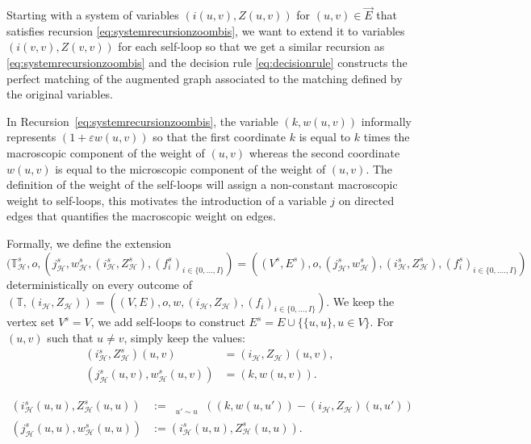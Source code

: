 \documentclass[11pt]{article}
\DeclareMathOperator{\lex}{lex}
\DeclareMathOperator*{\maxlex}{\overset{\lex}{\max}}
\newcommand{\eps}{\varepsilon}
\begin{document}
Starting with a system of variables $(i(u,v),Z(u,v))$ for $(u,v) \in \overset{\rightarrow}{E}$ that satisfies recursion \eqref{eq:systemrecursionzoombis}, we want to extend it to variables $(i(v,v),Z(v,v))$ for each self-loop so that we get a similar recursion as \eqref{eq:systemrecursionzoombis} and the decision rule \eqref{eq:decisionrule} constructs the perfect matching of the augmented graph associated to the matching defined by the original variables.

In Recursion~\eqref{eq:systemrecursionzoombis}, the variable $(k,w(u,v))$ informally represents $(1+\eps w(u,v))$ so that the first coordinate $k$ is equal to $k$ times the macroscopic component of the weight of $(u,v)$ whereas the second coordinate $w(u,v)$ is equal to the microscopic component of the weight of $(u,v)$. The definition of the weight of the self-loops will assign a non-constant macroscopic weight to self-loops, this motivates the introduction of a variable $j$ on directed edges that quantifies the macroscopic weight on edges.

Formally, we define the extension
\begin{equation} \label{eq:Tsh}
(\mathbb{T}^{s}_\mathcal{H},o,(j_{\mathcal{H}}^s,w_{\mathcal{H}}^s,(i_\mathcal{H}^s,Z_\mathcal{H}^{s}),(f_i^s)_{i \in \{0,...,I\}})=((V^{s},E^{s}),o,(j_{\mathcal{H}}^s,w^{s}_\mathcal{H}),(i_\mathcal{H}^s,Z_\mathcal{H}^{s}),(f_i^s)_{i \in \{0,....,I\}})
\end{equation}
deterministically on every outcome of $(\mathbb{T},(i_\mathcal{H},Z_\mathcal{H}))=((V,E),o,w,(i_\mathcal{H},Z_\mathcal{H}), (f_i)_{i \in \{0,...,I\}})$. 
We keep the vertex set $V^s=V$, we add self-loops to construct $E^s=E \cup \{ \{u,u\} , u \in V\}$. For $(u,v)$ such that $u \neq v$, simply keep the values:
\begin{equation}
    \begin{aligned}
        (i_\mathcal{H}^s,Z_\mathcal{H}^s)(u,v)&=(i_\mathcal{H},Z_\mathcal{H})(u,v) ,\\
        (j_{\mathcal{H}}^s(u,v),w_{\mathcal{H}}^s(u,v))&=(k,w(u,v)).
    \end{aligned}
\end{equation}


\begin{equation}\label{def:selfloop}
\begin{aligned}
 (i_{\mathcal{H}}^s(u,u),Z_{\mathcal{H}}^s(u,u)) &:= \maxlex_{\substack{ u' \sim u}}\left( (k,w(u,u'))-(i_{\mathcal{H}},Z_{\mathcal{H}})(u,u') \right) \\
 (j_{\mathcal{H}}^s(u,u),w_{\mathcal{H}}^s(u,u))&:= (i_{\mathcal{H}}^s(u,u),Z^s_{\mathcal{H}}(u,u)).
\end{aligned}
\end{equation}
\end{document}
